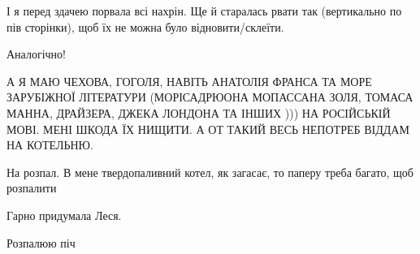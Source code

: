 \begin{itemize}
І я перед здачею порвала всі нахрін. Ще й старалась рвати так (вертикально по
пів сторінки), щоб їх не можна було відновити/склеїти.

 
Аналогічно!

\begin{itemize}
 

А Я МАЮ ЧЕХОВА, ГОГОЛЯ, НАВІТЬ АНАТОЛІЯ ФРАНСА ТА МОРЕ ЗАРУБІЖНОЇ ЛІТЕРАТУРИ
(МОРІСАДРЮОНА МОПАССАНА ЗОЛЯ, ТОМАСА МАННА, ДРАЙЗЕРА, ДЖЕКА ЛОНДОНА ТА ІНШИХ
))) НА РОСІЙСЬКІЙ МОВІ. МЕНІ ШКОДА ЇХ НИЩИТИ. А ОТ ТАКИЙ ВЕСЬ НЕПОТРЕБ ВІДДАМ
НА КОТЕЛЬНЮ.

\end{itemize}

 
На розпал. В мене твердопаливний котел, як загасає, то паперу треба багато, щоб розпалити

 
Гарно придумала Леся.

 
Розпалюю піч

 

\end{itemize}
